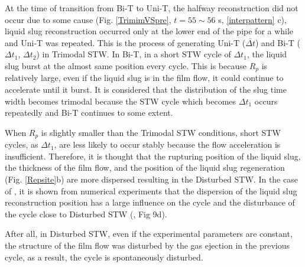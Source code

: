 \documentclass[aps,pre,preprint,groupedaddress,showkeys]{revtex4-2}
\begin{document}
At the time of transition from Bi-T to Uni-T, the halfway reconstruction did not occur due to some cause (Fig. \ref{TrimimVSpre}, $ t = 55 \sim56 $ s, \ref{interpattern} c), liquid slug reconstruction occurred only at the lower end of the pipe for a while and Uni-T was repeated.
This is the process of generating Uni-T ($ \bar{\Delta t} $) and Bi-T ($ \Delta t_ {1} $, $ \Delta t_ {2} $) in Trimodal STW.
In Bi-T, in a short STW cycle of $ \Delta t_ {1} $, the liquid slug burst at the almost same position every cycle.
This is because $ R_p $ is relatively large, even if the liquid slug is in the film flow, it could continue to accelerate until it burst.
It is considered that the distribution of the slug time width becomes trimodal because the STW cycle which becomes $ \Delta t_ {1} $ occurs repeatedly and Bi-T continues to some extent.

When $ R_p $ is slightly smaller than the Trimodal STW conditions, short STW cycles, as $ \Delta t_ {1} $, are less likely to occur stably because the flow acceleration is insufficient.
Therefore, it is thought that the rupturing position of the liquid slug, the thickness of the film flow, and the position of the liquid slug regeneration (Fig. \ref{Repsite}b) are more dispersed resulting in the Disturbed STW.
In the case of \cite{kanno2018}, it is shown from numerical experiments that the dispersion of the liquid slug reconstruction position has a large influence on the cycle and the disturbance of the cycle close to Disturbed STW (\cite{kanno2018}, Fig 9d).

After all, in Disturbed STW, even if the experimental parameters are constant, the structure of the film flow was disturbed by the gas ejection in the previous cycle, as a result, the cycle is spontaneously disturbed.
\end{document}
